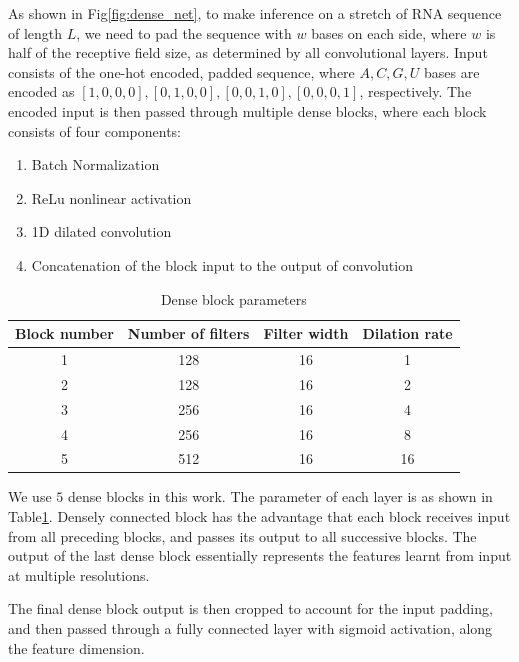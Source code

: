 \documentclass{proposal}
\begin{document}
As shown in Fig\ref{fig:dense_net}, to make inference on a stretch of RNA sequence of length $L$,
we need to pad the sequence with $w$ bases on each side, where $w$ is half of the receptive field size,
as determined by all convolutional layers.
Input consists of the one-hot encoded, padded sequence,
where $A, C, G, U$ bases are encoded as $[1, 0, 0, 0], [0, 1, 0, 0], [0, 0, 1, 0], [0, 0, 0, 1]$, respectively.
The encoded input is then passed through multiple dense blocks,
where each block consists of four components:

\begin{enumerate}
    \item Batch Normalization
    \item ReLu nonlinear activation
    \item 1D dilated convolution
    \item Concatenation of the block input to the output of convolution
\end{enumerate}


\begin{table}[h!]
    \centering
    \begin{tabular}{||c c c c||}
        \hline
        Block number & Number of filters & Filter width & Dilation rate \\ [0.5ex]
        \hline\hline
        1 & 128 & 16 & 1 \\
        \hline
        2 & 128 & 16 & 2 \\
        \hline
        3 & 256 & 16 & 4 \\
        \hline
        4 & 256 & 16 & 8 \\
        \hline
        5 & 512 & 16 & 16 \\ [1ex]
        \hline
    \end{tabular}
    \caption{Dense block parameters}
    \label{table:conv_layer_params}
\end{table}

We use $5$ dense blocks in this work. The parameter of each layer is as shown in Table\ref{table:conv_layer_params}.
Densely connected block has the advantage that each block receives input from all preceding blocks,
and passes its output to all successive blocks.
The output of the last dense block essentially represents the features learnt from input at multiple resolutions.

The final dense block output is then cropped to account for the input padding,
and then passed through a fully connected layer with sigmoid activation, along the feature dimension.
\end{document}
